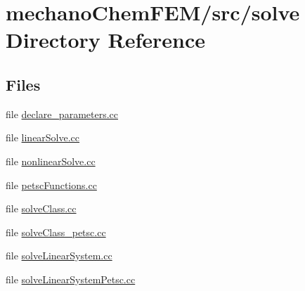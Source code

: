 \section{mechano\-Chem\-F\-E\-M/src/solve Directory Reference}
\label{dir_42e9ed0f2b1521169717a931c6f25fb9}
\subsection*{Files}
\begin{DoxyCompactItemize}
\item 
file \hyperlink{solve_2declare__parameters_8cc}{declare\-\_\-parameters.\-cc}
\item 
file \hyperlink{linear_solve_8cc}{linear\-Solve.\-cc}
\item 
file \hyperlink{nonlinear_solve_8cc}{nonlinear\-Solve.\-cc}
\item 
file \hyperlink{petsc_functions_8cc}{petsc\-Functions.\-cc}
\item 
file \hyperlink{solve_class_8cc}{solve\-Class.\-cc}
\item 
file \hyperlink{solve_class__petsc_8cc}{solve\-Class\-\_\-petsc.\-cc}
\item 
file \hyperlink{solve_linear_system_8cc}{solve\-Linear\-System.\-cc}
\item 
file \hyperlink{solve_linear_system_petsc_8cc}{solve\-Linear\-System\-Petsc.\-cc}
\end{DoxyCompactItemize}
